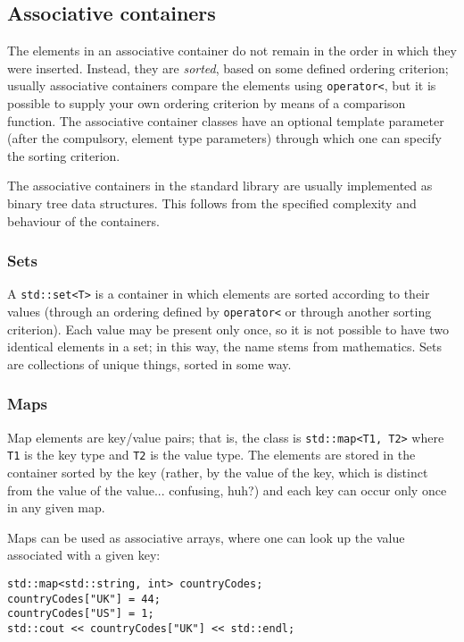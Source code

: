 \documentclass[a4paper]{scrartcl}
\begin{document}
\subsection{Associative containers}\label{sec:containers_associative}
The elements in an associative container do not remain in the order in which they were inserted. Instead, they are \emph{sorted}, based on some defined ordering criterion; usually associative containers compare the elements using \verb|operator<|, but it is possible to supply your own ordering criterion by means of a comparison function. The associative container classes have an optional template parameter (after the compulsory, element type parameters) through which one can specify the sorting criterion.

The associative containers in the standard library are usually implemented as binary tree data structures. This follows from the specified complexity and behaviour of the containers.

\subsubsection{Sets}\label{sec:containers_associative_set}
A \verb|std::set<T>| is a container in which elements are sorted according to their values (through an ordering defined by \verb|operator<| or through another sorting criterion). Each value may be present only once, so it is not possible to have two identical elements in a set; in this way, the name stems from mathematics. Sets are collections of unique things, sorted in some way.

\subsubsection{Maps}\label{sec:containers_associative_map}
Map elements are key/value pairs; that is, the class is \verb|std::map<T1, T2>| where \verb|T1| is the key type and \verb|T2| is the value type. The elements are stored in the container sorted by the key (rather, by the value of the key, which is distinct from the value of the value... confusing, huh?) and each key can occur only once in any given map.

Maps can be used as associative arrays, where one can look up the value associated with a given key:
\begin{verbatim}
std::map<std::string, int> countryCodes;
countryCodes["UK"] = 44;
countryCodes["US"] = 1;
std::cout << countryCodes["UK"] << std::endl;
\end{verbatim}
\end{document}
